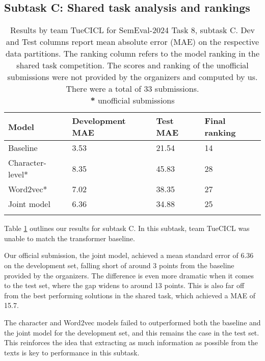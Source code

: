 \subsection{Subtask C: Shared task analysis and rankings}

\begin{table}[ht]
    \vspace{0.1cm}
    \centering
    \begin{tabular}{llll}
        \toprule
        \textbf{Model}   & \textbf{Development MAE} & \textbf{Test MAE} & \textbf{Final ranking} \\
        \midrule
        Baseline         & 3.53                     & 21.54             & 14                     \\
        \midrule
        Character-level* & 8.35                     & 45.83             & 28                     \\
        Word2vec*        & 7.02                     & 38.35             & 27                     \\
        Joint model      & 6.36                     & 34.88             & 25                     \\
        \bottomrule
        \vspace{0.1cm}
    \end{tabular}
    \caption{
        Results by team TueCICL for SemEval-2024 Task 8, subtask C. Dev and Test columns report mean absolute error (MAE) on the respective data partitions.
        The ranking column refers to the model ranking in the shared task competition.
        The scores and ranking of the unofficial submissions were not provided by the organizers and computed by us. There were a total of 33 submissions.\\ \textbf{*} unofficial submissions}
    \label{tab:c_results}
\end{table}

Table \ref{tab:c_results} outlines our results for subtask C. In this subtask, team TueCICL was unable to match the transformer baseline.

Our official submission, the joint model, achieved a mean standard error of 6.36 on the development set, falling short of around 3 points from the baseline provided by the organizers.
The difference is even more dramatic when it comes to the test set, where the gap widens to around 13 points. This is also far off from the best performing solutions in the shared task, which achieved a MAE of 15.7.

The character and Word2vec models failed to outperformed both the baseline and the joint model for the development set, and this remains the case in the test set.
This reinforces the idea that extracting as much information as possible from the texts is key to performance in this subtask.


